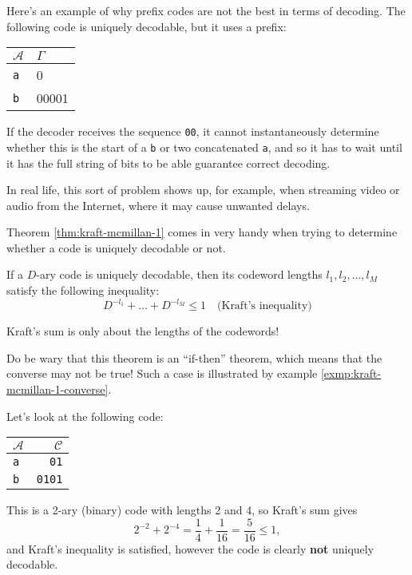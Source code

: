 \documentclass{report}
\begin{document}
\begin{exmp}\label{exmp:prefixes-are-not-so-great} Here's an example of why prefix codes are not the best in terms of decoding. The following code is uniquely decodable, but it uses a prefix:
\begin{center}
	\begin{tabular}{l | l} 
		$\mathcal A$ & $\Gamma$ \\ \hline
		\texttt a & 0 \\
		\texttt b & 00001
	\end{tabular}
\end{center}
If the decoder receives the sequence \texttt{00}, it cannot instantaneously determine whether this is the start of a \texttt{b} or two concatenated \texttt{a}, and so it has to wait until it has the full string of bits to be able guarantee correct decoding. \par
 In real life, this sort of problem shows up, for example, when streaming video or audio from the Internet, where it may cause unwanted delays. 
\end{exmp}

Theorem \ref{thm:kraft-mcmillan-1} comes in very handy when trying to determine whether a code is uniquely decodable or not.

\begin{thm}\label{thm:kraft-mcmillan-1}
	If a $D$-ary code is uniquely decodable, then its codeword lengths $l_1, l_2, \ldots, l_M$ satisfy the following inequality:
\begin{equation}
	D^{-l_1} + \dots + D^{-l_M} \leq 1 \quad \text{(Kraft's inequality)}
\end{equation}
\begin{remark}
Kraft's sum is only about the lengths of the codewords!
\end{remark}
\end{thm}
Do be wary that this theorem is an ``if-then'' theorem, which means that the converse may not be true! Such a case is illustrated by example \ref{exmp:kraft-mcmillan-1-converse}.

\begin{exmp}\label{exmp:kraft-mcmillan-1-converse}
Let's look at the following code:
\begin{center}
	\begin{tabular}{l | r}
	$\mathcal A$ & $\mathcal C$ \\ \hline
	\texttt a & \texttt{01} \\
	\texttt b & \texttt{0101}	
	\end{tabular}
\end{center}
	This is a 2-ary (binary) code with lengths 2 and 4, so Kraft's sum gives
	\begin{equation*}
		2^{-2} + 2^{-4} = \frac14 + \frac{1}{16} = \frac{5}{16} \leq 1,
	\end{equation*}
	and Kraft's inequality is satisfied, however the code is clearly \textbf{not} uniquely decodable.
\end{exmp}
\end{document}
